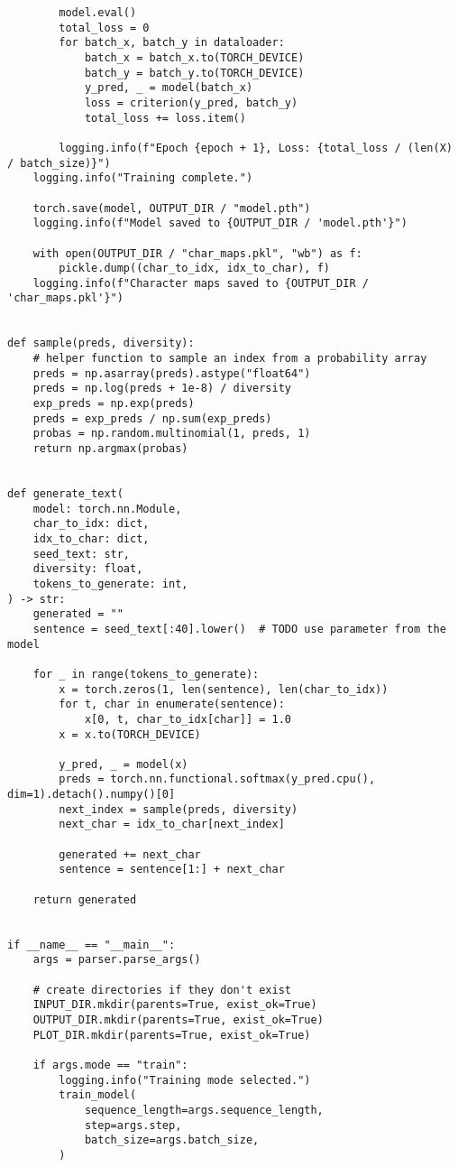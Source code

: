 \documentclass{article}
\begin{document}
\begin{lstlisting}
        model.eval()
        total_loss = 0
        for batch_x, batch_y in dataloader:
            batch_x = batch_x.to(TORCH_DEVICE)
            batch_y = batch_y.to(TORCH_DEVICE)
            y_pred, _ = model(batch_x)
            loss = criterion(y_pred, batch_y)
            total_loss += loss.item()

        logging.info(f"Epoch {epoch + 1}, Loss: {total_loss / (len(X) / batch_size)}")
    logging.info("Training complete.")

    torch.save(model, OUTPUT_DIR / "model.pth")
    logging.info(f"Model saved to {OUTPUT_DIR / 'model.pth'}")

    with open(OUTPUT_DIR / "char_maps.pkl", "wb") as f:
        pickle.dump((char_to_idx, idx_to_char), f)
    logging.info(f"Character maps saved to {OUTPUT_DIR / 'char_maps.pkl'}")


def sample(preds, diversity):
    # helper function to sample an index from a probability array
    preds = np.asarray(preds).astype("float64")
    preds = np.log(preds + 1e-8) / diversity
    exp_preds = np.exp(preds)
    preds = exp_preds / np.sum(exp_preds)
    probas = np.random.multinomial(1, preds, 1)
    return np.argmax(probas)


def generate_text(
    model: torch.nn.Module,
    char_to_idx: dict,
    idx_to_char: dict,
    seed_text: str,
    diversity: float,
    tokens_to_generate: int,
) -> str:
    generated = ""
    sentence = seed_text[:40].lower()  # TODO use parameter from the model

    for _ in range(tokens_to_generate):
        x = torch.zeros(1, len(sentence), len(char_to_idx))
        for t, char in enumerate(sentence):
            x[0, t, char_to_idx[char]] = 1.0
        x = x.to(TORCH_DEVICE)

        y_pred, _ = model(x)
        preds = torch.nn.functional.softmax(y_pred.cpu(), dim=1).detach().numpy()[0]
        next_index = sample(preds, diversity)
        next_char = idx_to_char[next_index]

        generated += next_char
        sentence = sentence[1:] + next_char

    return generated


if __name__ == "__main__":
    args = parser.parse_args()

    # create directories if they don't exist
    INPUT_DIR.mkdir(parents=True, exist_ok=True)
    OUTPUT_DIR.mkdir(parents=True, exist_ok=True)
    PLOT_DIR.mkdir(parents=True, exist_ok=True)

    if args.mode == "train":
        logging.info("Training mode selected.")
        train_model(
            sequence_length=args.sequence_length,
            step=args.step,
            batch_size=args.batch_size,
        )


\end{lstlisting}
\end{document}

